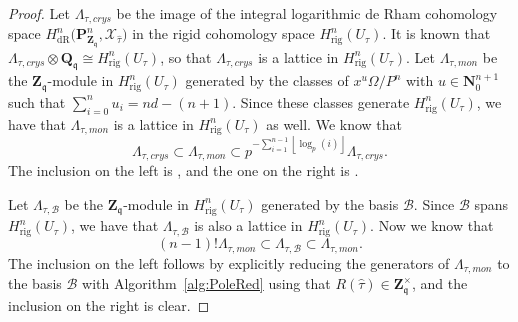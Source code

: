 \documentclass[a4paper,11pt]{article}
\numberwithin{equation}{section}
\providecommand{\floor}[1]{\left\lfloor#1\right\rfloor}   %
\newcommand{\NN}{\mathbf{N}} %
\newcommand{\ZZ}{\mathbf{Z}} %
\newcommand{\QQ}{\mathbf{Q}} %
\providecommand{\HdR}{H_{\text{dR}}}    %
\providecommand{\Hrig}{H_{\text{rig}}}  %
\providecommand{\cB}{\mathcal{B}} %
\theoremstyle{definition}
\begin{document}
\begin{proof}
Let $\Lambda_{\tau, crys}$ be the image of the integral logarithmic de Rham 
cohomology space 
$\HdR^n\bigl(\mathbf{P}_{\mathbf{Z}_{\mathfrak{q}}}^n,\mathcal{X}_{\hat{\tau}}\bigr)$ 
in the rigid cohomology space $\Hrig^n(U_{\tau})$. It is known that
$\Lambda_{\tau, crys} \otimes \QQ_{\mathfrak{q}} \cong \Hrig^n(U_{\tau})$, 
so that $\Lambda_{\tau, crys}$ is a lattice in $\Hrig^n(U_{\tau})$.  Let 
$\Lambda_{\tau, mon}$ be the $\ZZ_{\mathfrak{q}}$-module in $\Hrig^n(U_{\tau})$ 
generated by the classes of $x^u \Omega/P^n$ with $u \in \NN_0^{n+1}$ such that 
$\sum_{i=0}^n u_i = nd-(n+1)$. Since these classes generate $\Hrig^n(U_{\tau})$, we have 
that $\Lambda_{\tau,mon}$ is a lattice in $\Hrig^n(U_{\tau})$ as well. We know 
that
\[
\Lambda_{\tau,crys} \subset \Lambda_{\tau,mon} \subset p^{-\sum_{i=1}^{n-1} \floor{\log_p(i)}} \Lambda_{\tau,crys}.
\]
The inclusion on the left is \citep[Lemma 3.4.3]{AbbottKedlayaRoe2006}, and the 
one on the right is \citep[Proposition 3.4.6]{AbbottKedlayaRoe2006}.

Let $\Lambda_{\tau,\cB}$ be the $\ZZ_{\mathfrak{q}}$-module in $\Hrig^n(U_{\tau})$ 
generated by the basis $\cB$. Since $\cB$ spans $\Hrig^n(U_{\tau})$, we have that 
$\Lambda_{\tau,\cB}$ is also a lattice in $\Hrig^n(U_{\tau})$. Now we know that
\[
(n-1)! \Lambda_{\tau,mon} \subset \Lambda_{\tau,\cB} \subset \Lambda_{\tau,mon}. 
\]
The inclusion on the left follows by explicitly reducing the generators of 
$\Lambda_{\tau,mon}$ to the basis $\cB$ with Algorithm~\ref{alg:PoleRed} using 
that $R(\hat{\tau}) \in \ZZ_{\mathfrak{q}}^{\times}$, and the inclusion on the right is clear.


\end{proof}
\end{document}
